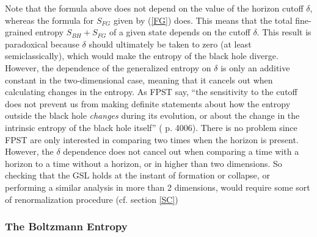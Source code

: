 \documentclass[12pt]{article}
\begin{document}
Note that the formula above does not depend on the value of the horizon cutoff $\delta$, whereas the formula for $S_{FG}$ given by (\ref{FG}) does.  This means that the total fine-grained entropy $S_{BH} + S_{FG}$ of a given state depends on the cutoff $\delta$.  This result is paradoxical because $\delta$ should ultimately be taken to zero (at least semiclassically), which would make the entropy of the black hole diverge.  However, the dependence of the generalized entropy on $\delta$ is only an additive constant in the two-dimensional case, meaning that it cancels out when calculating changes in the entropy.  As FPST say, ``the sensitivity to the cutoff does not prevent us from making definite statements about how the entropy outside the black hole \emph{changes} during its evolution, or about the change in the intrinsic entropy of the black hole itself'' (\cite{fiola94} p. 4006).  There is no problem since FPST are only interested in comparing two times when the horizon is present.  However, the $\delta$ dependence does not cancel out when comparing a time with a horizon to a time without a horizon, or in higher than two dimensions.  So checking that the GSL holds at the instant of formation or collapse, or performing a similar analysis in more than 2 dimensions, would require some sort of renormalization procedure (cf. section \ref{SC})

\subsubsection{The Boltzmann Entropy}\label{Boltz}
\end{document}
